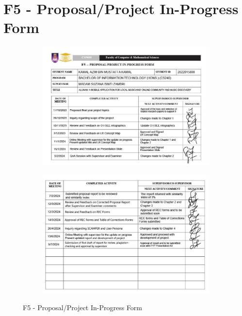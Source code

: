 \chapter{F5 - Proposal/Project In-Progress Form}
\begin{figure}[h]
    \centering
    \begin{subfigure}[b]{0.85\textwidth}
        \centering
        \includegraphics[width=\textwidth]{appendices/forms/f5a.jpg}
        \label{fig:sub1}
    \end{subfigure}
    \hspace{0.08\textwidth}
    \begin{subfigure}[b]{0.85\textwidth}
        \centering
        \includegraphics[width=\textwidth]{appendices/forms/f5b.jpg}
        \label{fig:sub2}
    \end{subfigure}
    \caption{F5 - Proposal/Project In-Progress Form}
    \label{fig:myfig99}
\end{figure}
\clearpage
